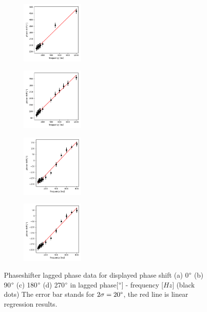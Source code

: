 \documentclass{article}
\begin{document}
 
 \begin{figure}[H]
    \begin{subfigure}[b]{3.1cm}
        \centering
        \includegraphics[width=3.1cm]{../results/phaseshifter_phase_freq_plot(phase0).png}
        \caption{}
    \end{subfigure}
    \hfill
    \begin{subfigure}[b]{3.1cm}
      \centering
      \includegraphics[width=3.1cm]{../results/phaseshifter_phase_freq_plot(phase90).png}
      \caption{}
  \end{subfigure}
  \hfill
  \begin{subfigure}[b]{3.1cm}
    \centering
    \includegraphics[width=3.1cm]{../results/phaseshifter_phase_freq_plot(phase180).png}
    \caption{}
  \end{subfigure}
  \hfill
  \begin{subfigure}[b]{3.1cm}
    \centering
    \includegraphics[width=3.1cm]{../results/phaseshifter_phase_freq_plot(phase270).png}
    \caption{}
  \end{subfigure}
  \hfill
    \caption{Phaseshifter lagged phase data for displayed phase shift (a) 0$\degree$ (b) 90$\degree$ (c) 180$\degree$ (d) 270$\degree$ in lagged phase[$\degree$] - frequency [$Hz$] (black dots)
        The error bar stands for $2\sigma = 20\degree$, the red line is linear regression results.
     }
    \label{fig: phaseshifter_phase_plot}
  \end{figure}
\end{document}
